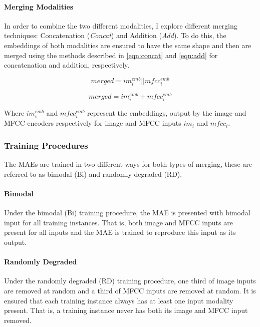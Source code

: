 \paragraph{Merging Modalities}
In order to combine the two different modalities, I explore different merging techniques: Concatenation (\textit{Concat}) and Addition (\textit{Add}). To do this, the embeddings of both modalities are ensured to have the same shape and then are merged using the methods described in \autoref{eqn:concat} and \autoref{eqn:add} for concatenation and addition, respectively. %

 \begin{equation}\label{eqn:concat}
 	merged = im_i^{emb} || mfcc_i^{emb} 	
 \end{equation}

 \begin{equation}\label{eqn:add}  
 	merged = im_i^{emb} + mfcc_i^{emb} 	
 \end{equation}
 

Where $im_i^{emb}$ and $mfcc_i^{emb}$ represent the embeddings, output by the image and MFCC encoders respectively for image and MFCC inputs $im_i$ and $mfcc_i$.

\subsubsection{Training Procedures}

The MAEs are trained in two different ways for both types of merging, these are referred to as bimodal (Bi) and randomly degraded (RD).

\paragraph{Bimodal}
Under the bimodal (Bi) training procedure, the MAE is presented with bimodal input for all training instances. That is, both image and MFCC inputs are present for all inputs and the MAE is trained to reproduce this input as its output.

\paragraph{Randomly Degraded}
Under the randomly degraded (RD) training procedure, one third of image inputs are removed at random and a third of MFCC inputs are removed at random. It is ensured that each training instance always has at least one input modality present. That is, a training instance never has both its image and MFCC input removed. 

